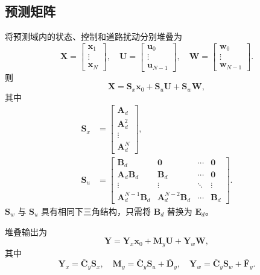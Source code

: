 \documentclass[UTF8,12pt,a4paper,fontset=windows]{ctexart}
\newcommand{\vect}[1]{\bm{#1}}
\begin{document}
\subsection{预测矩阵}

将预测域内的状态、控制和道路扰动分别堆叠为
\begin{equation}
\vect{X}=\begin{bmatrix}\vect{x}_1\\\vdots\\\vect{x}_N\end{bmatrix},\quad
\vect{U}=\begin{bmatrix}\vect{u}_0\\\vdots\\\vect{u}_{N-1}\end{bmatrix},\quad
\vect{W}=\begin{bmatrix}\vect{w}_0\\\vdots\\\vect{w}_{N-1}\end{bmatrix}.
\end{equation}
则
\begin{equation}
\vect{X}=\vect{S}_x\vect{x}_0+\vect{S}_u\vect{U}+\vect{S}_w\vect{W},
\end{equation}
其中
\begin{align}
\vect{S}_x&=
\begin{bmatrix}
\vect{A}_d\\ \vect{A}_d^2\\ \vdots\\ \vect{A}_d^N
\end{bmatrix},\\[2mm]
\vect{S}_u&=
\begin{bmatrix}
\vect{B}_d & \vect{0} & \cdots & \vect{0}\\
\vect{A}_d\vect{B}_d & \vect{B}_d & \cdots & \vect{0}\\
\vdots & \vdots & \ddots & \vdots\\
\vect{A}_d^{N-1}\vect{B}_d & \vect{A}_d^{N-2}\vect{B}_d & \cdots & \vect{B}_d
\end{bmatrix}.
\end{align}
$\vect{S}_w$ 与 $\vect{S}_u$ 具有相同下三角结构，只需将 $\vect{B}_d$ 替换为 $\vect{E}_d$。

堆叠输出为
\begin{equation}
\vect{Y}=\vect{Y}_x\vect{x}_0+\vect{M}_y\vect{U}+\vect{Y}_w\vect{W},
\end{equation}
其中
\begin{equation}
\vect{Y}_x=\bar{\vect{C}}_y\vect{S}_x,\quad
\vect{M}_y=\bar{\vect{C}}_y\vect{S}_u+\bar{\vect{D}}_y,\quad
\vect{Y}_w=\bar{\vect{C}}_y\vect{S}_w+\bar{\vect{F}}_y.
\end{equation}
\end{document}

